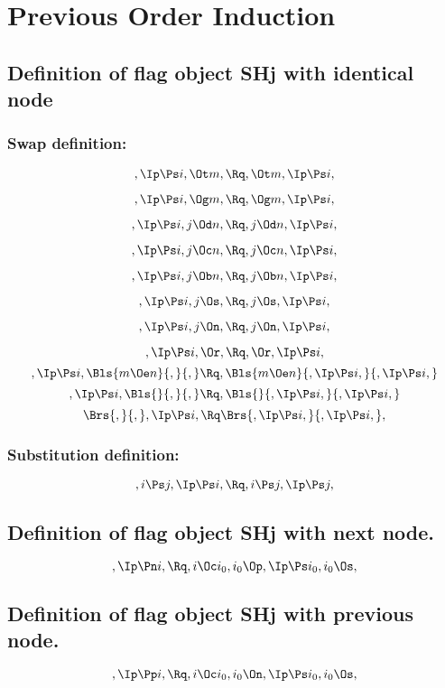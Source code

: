
\chapter{Previous Order Induction}
\section{Definition of flag object SHj with identical node}


\subsection{Swap definition:}
\[,\Ip \Ps i, \Ot m, \Rq , \Ot m, \Ip \Ps i,\]

\[,\Ip \Ps i, \Og m, \Rq , \Og m, \Ip \Ps i,\]

\[,\Ip \Ps i, j \Od n, \Rq , j \Od n, \Ip \Ps i,\]

\[,\Ip \Ps i, j \Oc n, \Rq , j \Oc n, \Ip \Ps i,\]

\[,\Ip \Ps i, j \Ob n, \Rq , j \Ob n, \Ip \Ps i,\]

\[,\Ip \Ps i, j \Os, \Rq , j \Os, \Ip \Ps i,\]

\[,\Ip \Ps i, j \On, \Rq , j \On, \Ip \Ps i,\]

\[,\Ip \Ps i, \Or, \Rq , \Or, \Ip \Ps i,\]
\bigskip
\[,\Ip \Ps i, \Bls{m \Oe n}{,}{,} \Rq , \Bls{m \Oe n}{,\Ip \Ps i,}{,\Ip \Ps i,}\]
\bigskip
\[,\Ip \Ps i, \Bls{}{,}{,} \Rq , \Bls{}{,\Ip \Ps i,}{,\Ip \Ps i,}\]
\bigskip
\[ \Brs{,}{,},\Ip \Ps i, \Rq \Brs{,\Ip \Ps i,}{,\Ip \Ps i,},\]




\bigskip
\bigskip
\subsection{Substitution definition:}
\[,i \Ps j, \Ip \Ps i, \Rq , i\Ps j, \Ip \Ps j,\]



\bigskip
\bigskip
\bigskip
\bigskip
\section{Definition of flag object SHj with next node.}
\[, \Ip \Pn i, \Rq , i \Oc i_0, i_0 \Op, \Ip \Ps i_0, i_0 \Os,\]


\bigskip
\bigskip
\bigskip
\bigskip
\section{Definition of flag object SHj with previous node.}
\[, \Ip \Pp i, \Rq , i \Oc i_0, i_0 \On, \Ip \Ps i_0, i_0 \Os,\]


